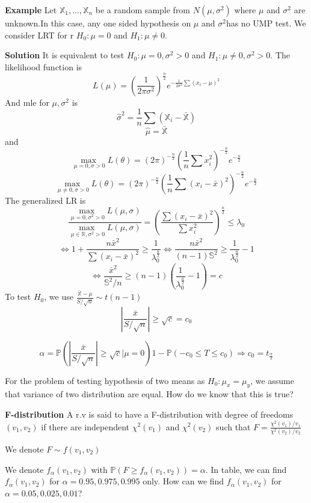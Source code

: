 \textbf{Example}  Let $\mathbb{X}_1, ..., \mathbb{X}_n$ be a random sample from $N(\mu, \sigma^2)$ where $\mu$ and $\sigma^2$ are unknown.In this case, any one sided  hypothesis on $\mu$ and $\sigma^2$has no UMP test. We consider LRT for  r $H_0: \mu = 0$ and $H_1: \mu \neq 0$.

\textbf{Solution} It is equivalent to test  $H_0: \mu = 0, \sigma^2>0$ and $H_1: \mu \neq 0, \sigma^2>0$. The likelihood function is
$$L(\mu) = ( \frac{1}{2\pi\sigma^2} )^{\frac{n}{2}} e^{-\frac{1}{2\sigma^2}\sum(x_i-\mu)^2}$$
And mle for $\mu, \sigma^2$ is 
$$\hat{\sigma}^2 = \frac{1}{n}\sum (\mathbb{X}_i - \bar{\mathbb{X}})$$
$$\hat{\mu} = \bar{\mathbb{X}}$$
and
$$\underset{\mu = 0, \sigma>0}{\max\ } L(\theta) = (2\pi)^{-\frac{n}{2}} (\frac{1}{n}\sum x_i^2)^{-\frac{n}{2}} e^{-\frac{n}{2}}$$
$$\underset{\mu \neq 0, \sigma>0}{\max\ } L(\theta)
= (2\pi)^{-\frac{n}{2}} (\frac{1}{n}\sum (x_i-\bar{x})^2)^{-\frac{n}{2}} e^{-\frac{n}{2}}$$
The generalized LR is
$$\frac{\underset{\mu = 0, \sigma^2>0}{\max\ } L(\mu, \sigma)}{\underset{\mu\in\mathbb{R}, \sigma^2>0}{\max\ } L(\mu, \sigma)}
= (\frac{\sum (x_i-\bar{x})^2}{\sum x_i^2})^\frac{n}{2} \leq \lambda_0$$
$$\iff 1 + \frac{n\bar{x}^2}{\sum(x_i-\bar{x})^2} \geq \frac{1}{\lambda_0^\frac{n}{2}}
 \iff \frac{n\bar{x}^2}{(n-1)\mathbb{S}^2} \geq  \frac{1}{\lambda_0^\frac{n}{2}} - 1$$
$$\iff \frac{\bar{x}^2}{\mathbb{S}^2/n} \geq (n-1)(\frac{1}{\lambda_0^\frac{n}{2}} - 1) = c$$
To test $H_0$, we use $\frac{\bar{\mathbb{X}}-\mu}{S/\sqrt{n}} \sim t(n-1)$
$$|\frac{\bar{x}}{S/\sqrt{n}}| \geq \sqrt{c} = c_0$$

$$\alpha = \mathbb{P}(|\frac{\bar{x}}{S/\sqrt{n}}| \geq \sqrt{c} | \mu = 0)
1 - \mathbb{P}(-c_0 \leq T \leq c_0) \Rightarrow c_0 = t_{\frac{\alpha}{2}}$$

For the problem of testing hypothesis of two means as $H_0: \mu_x = \mu_y$, we assume that variance of two distribution are equal. How do we know that this is true?

\textbf{F-distribution}
A r.v is said to have a F-distribution with degree of freedoms $(v_1, v_2)$ if there are independent $\chi^2(v_1)$ and $\chi^2(v_2)$ such that $F = \frac{\chi^2(v_1)/v_1}{\chi^2(v_2)/v_2}$

We denote $F \sim f(v_1, v_2)$

We denote $f_\alpha(v_1, v_2)$ with $\mathbb{P}(F \geq f_\alpha(v_1, v_2)) = \alpha$. In table, we can find $f_\alpha(v_1, v_2)$ for $\alpha = 0.95, 0.975, 0.995$ only. How can we find $f_\alpha(v_1, v_2)$ for $\alpha = 0.05, 0.025, 0.01$?

